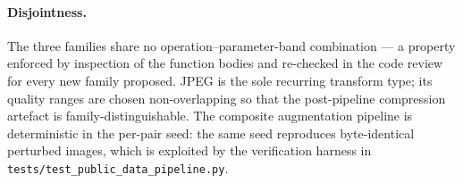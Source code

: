 \paragraph{Disjointness.} The three families share no
operation--parameter-band combination --- a property enforced by
inspection of the function bodies and re-checked in the code review for
every new family proposed. JPEG is the sole recurring transform type;
its quality ranges are chosen non-overlapping so that the post-pipeline
compression artefact is family-distinguishable. The composite
augmentation pipeline is deterministic in the per-pair seed: the same
seed reproduces byte-identical perturbed images, which is exploited by
the verification harness in \texttt{tests/test\_public\_data\_pipeline.py}.
